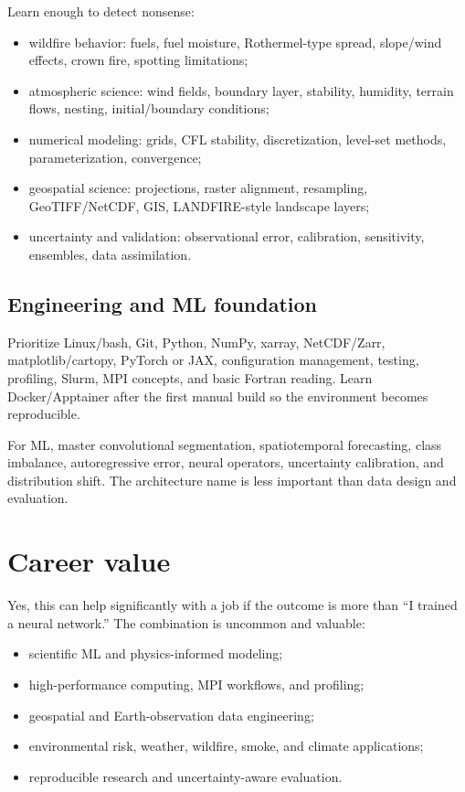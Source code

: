 \documentclass[11pt]{article}
\begin{document}
Learn enough to detect nonsense:
\begin{itemize}
  \item wildfire behavior: fuels, fuel moisture, Rothermel-type spread, slope/wind effects, crown fire, spotting limitations;
  \item atmospheric science: wind fields, boundary layer, stability, humidity, terrain flows, nesting, initial/boundary conditions;
  \item numerical modeling: grids, CFL stability, discretization, level-set methods, parameterization, convergence;
  \item geospatial science: projections, raster alignment, resampling, GeoTIFF/NetCDF, GIS, LANDFIRE-style landscape layers;
  \item uncertainty and validation: observational error, calibration, sensitivity, ensembles, data assimilation.
\end{itemize}

\subsection{Engineering and ML foundation}

Prioritize Linux/bash, Git, Python, NumPy, xarray, NetCDF/Zarr, matplotlib/cartopy, PyTorch or JAX, configuration management, testing, profiling, Slurm, MPI concepts, and basic Fortran reading. Learn Docker/Apptainer after the first manual build so the environment becomes reproducible.

For ML, master convolutional segmentation, spatiotemporal forecasting, class imbalance, autoregressive error, neural operators, uncertainty calibration, and distribution shift. The architecture name is less important than data design and evaluation.

\section{Career value}

Yes, this can help significantly with a job if the outcome is more than ``I trained a neural network.'' The combination is uncommon and valuable:

\begin{itemize}
  \item scientific ML and physics-informed modeling;
  \item high-performance computing, MPI workflows, and profiling;
  \item geospatial and Earth-observation data engineering;
  \item environmental risk, weather, wildfire, smoke, and climate applications;
  \item reproducible research and uncertainty-aware evaluation.
\end{itemize}
\end{document}
